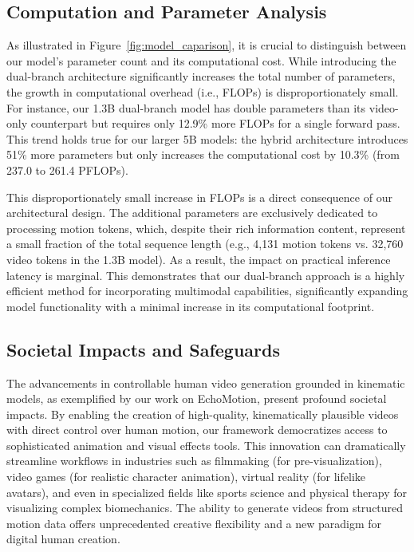 \subsection{Computation and Parameter Analysis}

As illustrated in Figure~\ref{fig:model_caparison}, it is crucial to distinguish between our model's parameter count and its computational cost. While introducing the dual-branch architecture significantly increases the total number of parameters, the growth in computational overhead (i.e., FLOPs) is disproportionately small. For instance, our 1.3B dual-branch model has double parameters than its video-only counterpart but requires only 12.9\% more FLOPs for a single forward pass. This trend holds true for our larger 5B models: the hybrid architecture introduces 51\% more parameters but only increases the computational cost by 10.3\% (from 237.0 to 261.4 PFLOPs).

This disproportionately small increase in FLOPs is a direct consequence of our architectural design. The additional parameters are exclusively dedicated to processing motion tokens, which, despite their rich information content, represent a small fraction of the total sequence length (e.g., 4,131 motion tokens vs. 32,760 video tokens in the 1.3B model). As a result, the impact on practical inference latency is marginal. This demonstrates that our dual-branch approach is a highly efficient method for incorporating multimodal capabilities, significantly expanding model functionality with a minimal increase in its computational footprint.

\subsection{Societal Impacts and Safeguards}
The advancements in controllable human video generation grounded in kinematic models, as exemplified by our work on EchoMotion, present profound societal impacts. By enabling the creation of high-quality, kinematically plausible videos with direct control over human motion, our framework democratizes access to sophisticated animation and visual effects tools. This innovation can dramatically streamline workflows in industries such as filmmaking (for pre-visualization), video games (for realistic character animation), virtual reality (for lifelike avatars), and even in specialized fields like sports science and physical therapy for visualizing complex biomechanics. The ability to generate videos from structured motion data offers unprecedented creative flexibility and a new paradigm for digital human creation.


